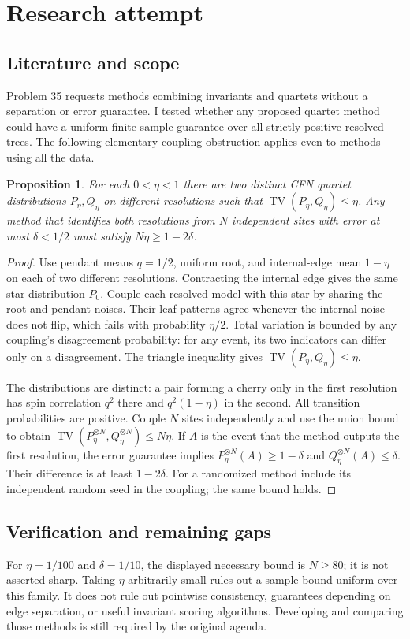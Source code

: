 \documentclass[11pt]{article}
\newtheorem{proposition}{Proposition}
\begin{document}
\section{Research attempt}
\subsection{Literature and scope}
Problem 35 requests methods combining invariants and quartets without a separation or error guarantee. I tested whether any proposed quartet method could have a uniform finite sample guarantee over all strictly positive resolved trees. The following elementary coupling obstruction applies even to methods using all the data.
\begin{proposition}
For each $0<\eta<1$ there are two distinct CFN quartet distributions $P_\eta,Q_\eta$ on different resolutions such that $\operatorname{TV}(P_\eta,Q_\eta)\le\eta$. Any method that identifies both resolutions from $N$ independent sites with error at most $\delta<1/2$ must satisfy $N\eta\ge1-2\delta$.
\end{proposition}
\begin{proof}
Use pendant means $q=1/2$, uniform root, and internal-edge mean $1-\eta$ on each of two different resolutions. Contracting the internal edge gives the same star distribution $P_0$. Couple each resolved model with this star by sharing the root and pendant noises. Their leaf patterns agree whenever the internal noise does not flip, which fails with probability $\eta/2$. Total variation is bounded by any coupling's disagreement probability: for any event, its two indicators can differ only on a disagreement. The triangle inequality gives $\operatorname{TV}(P_\eta,Q_\eta)\le\eta$.

The distributions are distinct: a pair forming a cherry only in the first resolution has spin correlation $q^2$ there and $q^2(1-\eta)$ in the second. All transition probabilities are positive. Couple $N$ sites independently and use the union bound to obtain $\operatorname{TV}(P_\eta^{\otimes N},Q_\eta^{\otimes N})\le N\eta$. If $A$ is the event that the method outputs the first resolution, the error guarantee implies $P_\eta^{\otimes N}(A)\ge1-\delta$ and $Q_\eta^{\otimes N}(A)\le\delta$. Their difference is at least $1-2\delta$. For a randomized method include its independent random seed in the coupling; the same bound holds.
\end{proof}
\subsection{Verification and remaining gaps}
For $\eta=1/100$ and $\delta=1/10$, the displayed necessary bound is $N\ge80$; it is not asserted sharp. Taking $\eta$ arbitrarily small rules out a sample bound uniform over this family. It does not rule out pointwise consistency, guarantees depending on edge separation, or useful invariant scoring algorithms. Developing and comparing those methods is still required by the original agenda.
\end{document}
